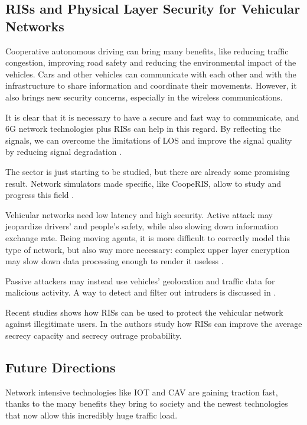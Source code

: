 \subsection{RISs and Physical Layer Security for Vehicular Networks}

Cooperative autonomous driving can bring many benefits, like reducing traffic congestion, improving road safety and reducing the environmental impact of the vehicles. Cars and other vehicles can communicate with each other and with the infrastructure to share information and coordinate their movements. However, it also brings new security concerns, especially in the wireless communications.

It is clear that it is necessary to have a secure and fast way to communicate, and 6G network technologies plus RISs can help in this regard. By reflecting the signals, we can overcome the limitations of LOS and improve the signal quality by reducing signal degradation \cite{10715713}.

The sector is just starting to be studied, but there are already some promising result. Network simulators made specific, like CoopeRIS, allow to study and progress this field \cite{SEGATA2024110443}.

Vehicular networks need low latency and high security. Active attack may jeopardize drivers' and people's safety, while also slowing down information exchange rate. Being moving agents, it is more difficult to correctly model this type of network, but also way more necessary: complex upper layer encryption may slow down data processing enough to render it useless \cite{8403278}.

Passive attackers may instead use vehicles' geolocation and traffic data for malicious activity. A way to detect and filter out intruders is discussed in \cite{8474336}.

Recent studies shows how RISs can be used to protect the vehicular network against illegitimate users. In \cite{makarfi2020reconfigurableintelligentsurfacesenabledvehicular} the authors study how RISs can improve the average secrecy capacity and secrecy outrage probability.

\subsection{Future Directions}

Network intensive technologies like IOT and CAV are gaining traction fast, thanks to the many benefits they bring to society and the newest technologies that now allow this incredibly huge traffic load.

